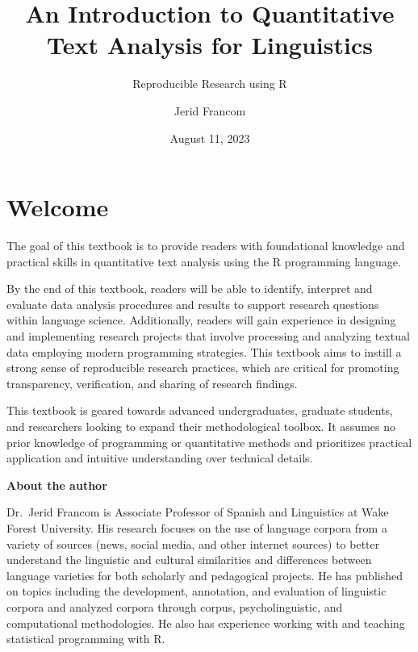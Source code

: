 \documentclass[
  letterpaper,
  DIV=11,
  numbers=noendperiod]{scrreport}
\title{An Introduction to Quantitative Text Analysis for Linguistics}
\subtitle{Reproducible Research using R}
\author{Jerid Francom}
\date{August 11, 2023}
\renewcommand*\contentsname{Table of contents}
\newcommand\contentsname{Table of contents}
\theoremstyle{definition}
\theoremstyle{remark}
\begin{document}
\maketitle
\ifdefined\Shaded\renewenvironment{Shaded}{\begin{tcolorbox}[sharp corners, boxrule=0pt, enhanced, colback={codebgcolor}, frame hidden, breakable, borderline west={3pt}{0pt}{shadecolor}]}{\end{tcolorbox}}\fi

\renewcommand*\contentsname{Table of contents}
{
\setcounter{tocdepth}{2}
\tableofcontents
}

\hypertarget{welcome}{%
\chapter*{Welcome}\label{welcome}}


The goal of this textbook is to provide readers with foundational
knowledge and practical skills in quantitative text analysis using the R
programming language.

By the end of this textbook, readers will be able to identify, interpret
and evaluate data analysis procedures and results to support research
questions within language science. Additionally, readers will gain
experience in designing and implementing research projects that involve
processing and analyzing textual data employing modern programming
strategies. This textbook aims to instill a strong sense of reproducible
research practices, which are critical for promoting transparency,
verification, and sharing of research findings.

This textbook is geared towards advanced undergraduates, graduate
students, and researchers looking to expand their methodological
toolbox. It assumes no prior knowledge of programming or quantitative
methods and prioritizes practical application and intuitive
understanding over technical details.

\textbf{About the author}

Dr.~Jerid Francom is Associate Professor of Spanish and Linguistics at
Wake Forest University. His research focuses on the use of language
corpora from a variety of sources (news, social media, and other
internet sources) to better understand the linguistic and cultural
similarities and differences between language varieties for both
scholarly and pedagogical projects. He has published on topics including
the development, annotation, and evaluation of linguistic corpora and
analyzed corpora through corpus, psycholinguistic, and computational
methodologies. He also has experience working with and teaching
statistical programming with R.
\end{document}
